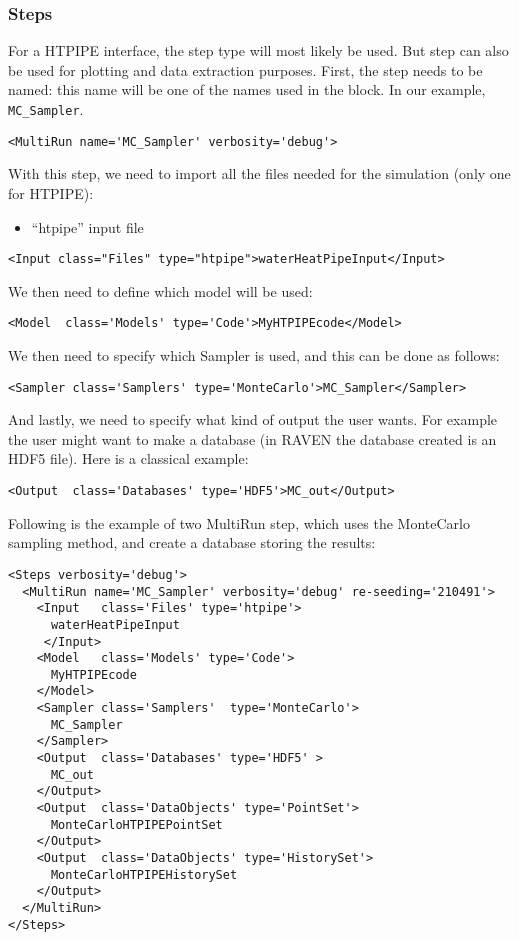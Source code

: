 \subsubsection{Steps}
For a HTPIPE interface, the  step type will most likely be
used. But  step can also be used for plotting and data extraction purposes.
%
First, the step needs to be named: this name will be one of the names used in
the  block.
%
In our example,  \texttt{MC\_Sampler}.
%
\begin{lstlisting}[style=XML,morekeywords={name,debug,re-seeding}]
     <MultiRun name='MC_Sampler' verbosity='debug'>
\end{lstlisting}

With this step, we need to import all the files needed for the simulation (only one for HTPIPE):
\begin{itemize}
  \item ``htpipe'' input file
\end{itemize}
\begin{lstlisting}[style=XML,morekeywords={name,class,type}]
    <Input class="Files" type="htpipe">waterHeatPipeInput</Input>
\end{lstlisting}
We then need to define which model will be used:
\begin{lstlisting}[style=XML]
    <Model  class='Models' type='Code'>MyHTPIPEcode</Model>
\end{lstlisting}
We then need to specify which Sampler is used, and this can be done as follows:
\begin{lstlisting}[style=XML]
    <Sampler class='Samplers' type='MonteCarlo'>MC_Sampler</Sampler>
\end{lstlisting}
And lastly, we need to specify what kind of output the user wants.
%
For example the user might want to make a database (in RAVEN the database
created is an HDF5 file).
%
Here is a classical example:
\begin{lstlisting}[style=XML,morekeywords={class,type}]
    <Output  class='Databases' type='HDF5'>MC_out</Output>
\end{lstlisting}

Following is the example of two MultiRun step, which uses the MonteCarlo sampling
method, and create a database storing the results:
\begin{lstlisting}[style=XML]
<Steps verbosity='debug'>
  <MultiRun name='MC_Sampler' verbosity='debug' re-seeding='210491'>
    <Input   class='Files' type='htpipe'>
      waterHeatPipeInput
     </Input>
    <Model   class='Models' type='Code'>
      MyHTPIPEcode
    </Model>
    <Sampler class='Samplers'  type='MonteCarlo'>
      MC_Sampler
    </Sampler>
    <Output  class='Databases' type='HDF5' >
      MC_out
    </Output>
    <Output  class='DataObjects' type='PointSet'>
      MonteCarloHTPIPEPointSet
    </Output>
    <Output  class='DataObjects' type='HistorySet'>
      MonteCarloHTPIPEHistorySet
    </Output>
  </MultiRun>
</Steps>
\end{lstlisting}

